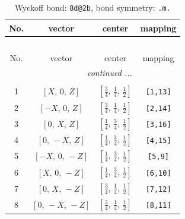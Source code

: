 \documentclass[fleqn,8pt]{jsarticle}
\begin{document}
\begin{longtable}{cccc}
\caption{Wyckoff bond: {\tt 8d@2b}, bond symmetry: {\tt .m.}}
 \\
 \hline \hline
No. & vector & center & mapping \\ \hline \endfirsthead

\multicolumn{3}{l}{\tablename\ \thetable{}} \\
 \hline \hline
No. & vector & center & mapping \\ \hline \endhead

 \hline \hline
\multicolumn{3}{r}{\footnotesize\it continued ...} \\ \endfoot

 \hline \hline
\multicolumn{3}{r}{} \\ \endlastfoot

1 & $\left[ X,\, 0,\, Z \right]$ & $\left[ \frac{3}{4},\, \frac{1}{4},\, \frac{1}{2} \right]$ & {\tt [1,13]} \\ \hline
2 & $\left[ - X,\, 0,\, Z \right]$ & $\left[ \frac{3}{4},\, \frac{1}{4},\, \frac{1}{2} \right]$ & {\tt [2,14]} \\ \hline
3 & $\left[ 0,\, X,\, Z \right]$ & $\left[ \frac{1}{4},\, \frac{3}{4},\, \frac{1}{2} \right]$ & {\tt [3,16]} \\ \hline
4 & $\left[ 0,\, - X,\, Z \right]$ & $\left[ \frac{1}{4},\, \frac{3}{4},\, \frac{1}{2} \right]$ & {\tt [4,15]} \\ \hline
5 & $\left[ - X,\, 0,\, - Z \right]$ & $\left[ \frac{1}{4},\, \frac{3}{4},\, \frac{1}{2} \right]$ & {\tt [5,9]} \\ \hline
6 & $\left[ X,\, 0,\, - Z \right]$ & $\left[ \frac{1}{4},\, \frac{3}{4},\, \frac{1}{2} \right]$ & {\tt [6,10]} \\ \hline
7 & $\left[ 0,\, X,\, - Z \right]$ & $\left[ \frac{3}{4},\, \frac{1}{4},\, \frac{1}{2} \right]$ & {\tt [7,12]} \\ \hline
8 & $\left[ 0,\, - X,\, - Z \right]$ & $\left[ \frac{3}{4},\, \frac{1}{4},\, \frac{1}{2} \right]$ & {\tt [8,11]} \\
\end{longtable}
\renewcommand{\arraystretch}{1.2}
\end{document}

